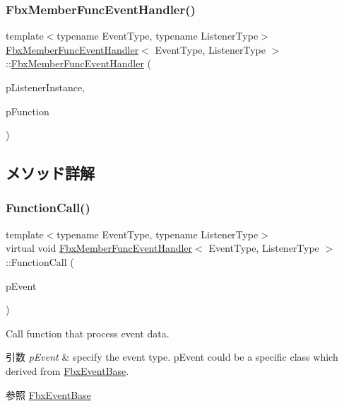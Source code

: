\subsubsection{\texorpdfstring{Fbx\+Member\+Func\+Event\+Handler()}{FbxMemberFuncEventHandler()}}
{\footnotesize\ttfamily template$<$typename Event\+Type, typename Listener\+Type$>$ \\
\hyperlink{class_fbx_member_func_event_handler}{Fbx\+Member\+Func\+Event\+Handler}$<$ Event\+Type, Listener\+Type $>$\+::\hyperlink{class_fbx_member_func_event_handler}{Fbx\+Member\+Func\+Event\+Handler} (\begin{DoxyParamCaption}\item[{Listener\+Type $\ast$}]{p\+Listener\+Instance,  }\item[{Callback\+Fnc}]{p\+Function }\end{DoxyParamCaption})}



\subsection{メソッド詳解}
\mbox{\label{class_fbx_member_func_event_handler_a4bcb037442927d480776bc2fb4b7bcd6}} 
\subsubsection{\texorpdfstring{Function\+Call()}{FunctionCall()}}
{\footnotesize\ttfamily template$<$typename Event\+Type, typename Listener\+Type$>$ \\
virtual void \hyperlink{class_fbx_member_func_event_handler}{Fbx\+Member\+Func\+Event\+Handler}$<$ Event\+Type, Listener\+Type $>$\+::Function\+Call (\begin{DoxyParamCaption}\item[{const \hyperlink{class_fbx_event_base}{Fbx\+Event\+Base} \&}]{p\+Event }\end{DoxyParamCaption})\hspace{0.3cm}{\ttfamily [virtual]}}

Call function that process event data. 
\begin{DoxyParams}{引数}
{\em p\+Event} & specify the event type. p\+Event could be a specific class which derived from \hyperlink{class_fbx_event_base}{Fbx\+Event\+Base}. \\
\hline
\end{DoxyParams}
\begin{DoxySeeAlso}{参照}
\hyperlink{class_fbx_event_base}{Fbx\+Event\+Base} 
\end{DoxySeeAlso}


